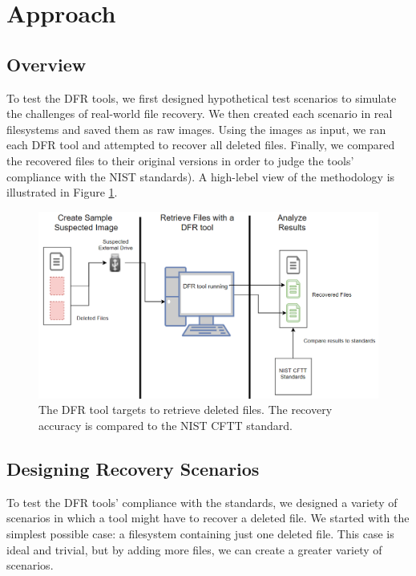 \section{Approach}

\subsection{Overview}

To test the DFR tools, we first designed hypothetical test scenarios to simulate the challenges of real-world file recovery.
We then created each scenario in real filesystems and saved them as raw images. 
Using the images as input, we ran each DFR tool and attempted to recover all deleted files. 
Finally, we compared the recovered files to their original versions in order to judge the tools' 
compliance with the NIST standards). A high-lebel view of the methodology is illustrated in Figure \ref{fig:overview}.

\begin{figure}[h]
    \centering
    \includegraphics[width=\linewidth]{fig/overview.png}
    \caption{The DFR tool targets to retrieve deleted files. The recovery accuracy is compared to the NIST CFTT standard.}
    \label{fig:overview}
\end{figure}

\subsection{Designing Recovery Scenarios}
To test the DFR tools' compliance with the standards, we designed a variety of scenarios in which a tool might have to recover a deleted file. 
We started with the simplest possible case: a filesystem containing just one deleted file. 
This case is ideal and trivial, but by adding more files, we can create a greater variety of scenarios.

